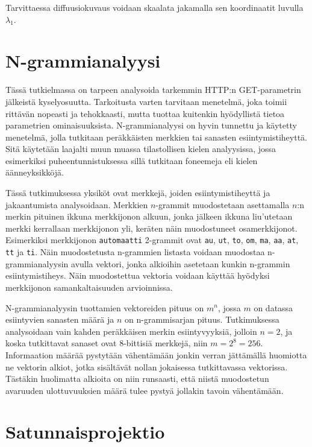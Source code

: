 Tarvittaessa diffuusiokuvaus voidaan skaalata jakamalla sen koordinaatit luvulla $\lambda_1$.

\section{N-grammianalyysi}


Tässä tutkielmassa on tarpeen analysoida tarkemmin HTTP:n GET-parametrin jälkeistä kyselyosuutta. Tarkoitusta varten tarvitaan menetelmä, joka toimii rittävän nopeasti ja tehokkaasti, mutta tuottaa kuitenkin hyödyllistä tietoa parametrien ominaisuuksista. N-\-grammianalyysi on hyvin tunnettu ja käytetty menetelmä, jolla tutkitaan 
peräkkäisten merkkien tai sanasten esiintymistiheyttä. Sitä käytetään laajalti muun muassa tilastollisen kielen analyysissa, jossa esimerkiksi puheentunnistuksessa sillä tutkitaan foneemeja eli kielen äänneyksikköjä. 

Tässä tutkimuksessa yksiköt ovat merkkejä, joiden esiintymistiheyttä ja jakaantumista analysoidaan. Merkkien $n$-grammit muodostetaan asettamalla $n$:n merkin pituinen ikkuna merkkijonon alkuun, jonka jälkeen ikkuna liu'utetaan merkki kerrallaan merkkijonon yli, keräten näin muodostuneet osamerkkijonot. Esimerkiksi merkkijonon \texttt{automaatti} 2-grammit ovat
\texttt{au},
\texttt{ut},
\texttt{to},
\texttt{om},
\texttt{ma},
\texttt{aa},
\texttt{at},
\texttt{tt} ja
\texttt{ti}.
Näin muodostetusta n-grammien listasta voidaan muodostaa n-grammianalyysin avulla vektori, jonka alkioihin asetetaan kunkin n-grammin esiintymistiheys. Näin muodostettua vektoria voidaan käyttää hyödyksi merkkijonon samankaltaisuuden arvioinnissa.

N-grammianalyysin tuottamien vektoreiden pituus on $m^n$, jossa $m$ on datassa esiintyvien sanasten määrä ja $n$ on n-grammisarjan pituus. Tutkimuksessa analysoidaan vain kahden peräkkäisen merkin esiintyvyyksiä, 
jolloin $n=2$, ja koska tutkittavat sanaset ovat 8-bittisiä merkkejä, niin $m=2^8=256$. Informaation määrää pystytään vähentämään jonkin verran jättämällä huomiotta ne vektorin alkiot, jotka sisältävät nollan jokaisessa tutkittavassa vektorissa. Tästäkin huolimatta alkioita on niin runsaasti, että niistä muodostetun avaruuden ulottuvuuksien määrä tulee pystyä jollakin tavoin vähentämään. 

\section{Satunnaisprojektio}

